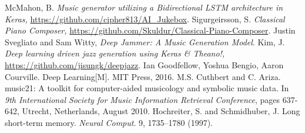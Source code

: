 \documentclass[conference]{IEEEtran}
\begin{document}
\begin{thebibliography}{00}
 McMahon, B. \textit{Music generator utilizing a Bidirectional LSTM architecture in Keras,} \url{https://github.com/cipher813/AI_Jukebox}.
 Sigurgeirsson, S. \textit{Classical Piano Composer,} \url{https://github.com/Skuldur/Classical-Piano-Composer}.
 Justin Svegliato and Sam Witty, \textit{Deep Jammer: A Music Generation Model}.
 Kim, J. \textit{Deep learning driven jazz generation using Keras \& Theano!,} \url{https://github.com/jisungk/deepjazz}.
 Ian Goodfellow, Yoshua Bengio, Aaron Courville. Deep Learning[M]. MIT Press, 2016.
 M.S. Cuthbert and C. Ariza. music21: A toolkit for computer-aided musicology and symbolic music data. In \textit{9th International Society for Music Information Retrieval Conference}, pages 637-642, Utrecht, Netherlands, August 2010.
 Hochreiter, S. and Schmidhuber, J. Long short-term memory. \textit{Neural Comput}. 9, 1735–1780 (1997).

\end{thebibliography}
\vspace{12pt}
\end{document}

